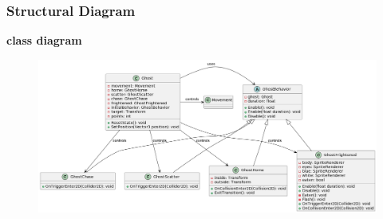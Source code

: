 \documentclass[11pt]{article}
\begin{document}
\subsubsection{Structural Diagram}
\textbf{class diagram}\\
\begin{figure}[H]
    \centering
    \includegraphics*[scale=0.25]{Ghost_Class.png}
\end{figure}
\end{document}
